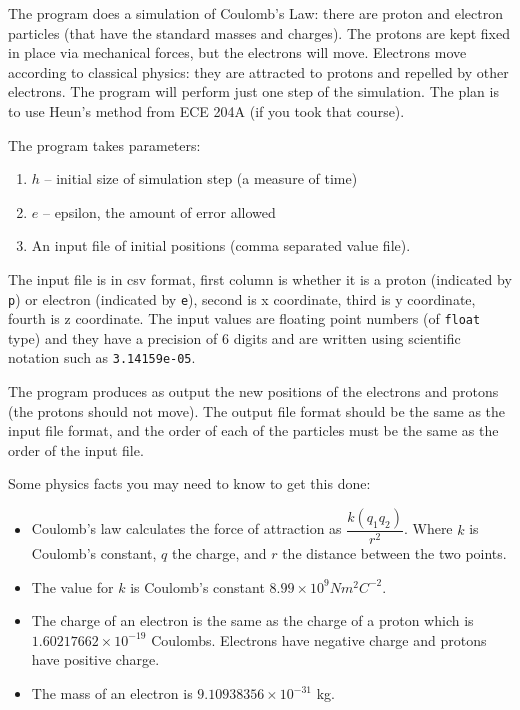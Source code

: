 \documentclass[letterpaper,10pt]{article}
\begin{document}
The program does a simulation of Coulomb's Law: there are proton and electron particles (that have the standard masses and charges). The protons are kept fixed in place via mechanical forces, but the electrons will move. Electrons move according to classical physics: they are attracted to protons and repelled by other electrons. The program will perform just one step of the simulation. The plan is to use Heun's method from ECE 204A (if you took that course).

The program takes parameters:
\begin{enumerate}
\item $h$ -- initial size of simulation step (a measure of time) 
\item $e$ -- epsilon, the amount of error allowed
\item An input file of initial positions (comma separated value file).
\end{enumerate}

The input file is in csv format, first column is whether it is a proton (indicated by \texttt{p}) or electron (indicated by \texttt{e}), second is x coordinate, third is y coordinate, fourth is z coordinate. The input values are floating point numbers (of \texttt{float} type) and they have a precision of 6 digits and are written using scientific notation such as \texttt{3.14159e-05}. 

The program produces as output the new positions of the electrons and protons (the protons should not move). The output file format should be the same as the input file format, and the order of each of the particles must be the same as the order of the input file.

Some physics facts you may need to know to get this done:

\begin{itemize}
\item Coulomb's law calculates the force of attraction as $\dfrac{k (q_{1} q_{2})}{r^{2}}$.  Where $k$ is Coulomb's constant, $q$ the charge, and $r$ the distance between the two points.

\item The value for $k$ is Coulomb's constant $8.99 \times 10^{9} N m^{2} C^{-2}$. 

\item The charge of an electron is the same as the charge of a proton which is $1.60217662 \times 10^{-19}$ Coulombs. Electrons have negative charge and protons have positive charge. 

\item The mass of an electron is $9.10938356 \times 10^{-31}$ kg.
\end{itemize}
\end{document}
